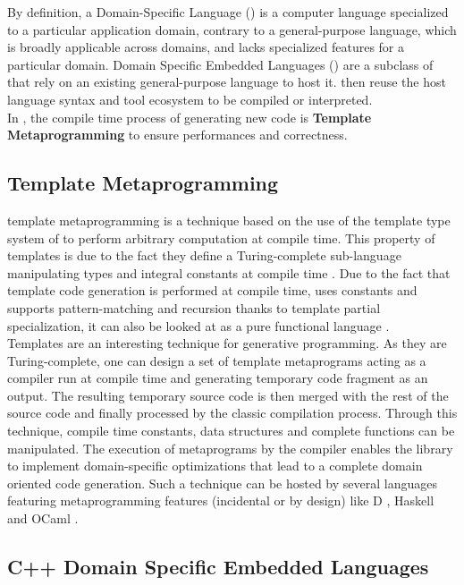 \documentclass[../../main.tex]{subfiles}
\begin{document}
By definition, a Domain-Specific Language (\dsl) is a computer language
specialized to a particular application domain, contrary to a general-purpose
language, which is broadly applicable across domains, and lacks specialized
features for a particular domain. Domain Specific Embedded Languages (\dsels)
are a subclass of \dsl that rely on an existing general-purpose language to host
it. \dsels then reuse the host language syntax and tool ecosystem to be compiled
or interpreted.\\

In \cpp, the compile time process of generating new code is \textbf{Template
Metaprogramming} to ensure performances and correctness.

\subsection{Template Metaprogramming}

\cpp template metaprogramming \cite{abrahams:2004} is a technique based on the
use of the template type system of \cpp to perform arbitrary computation at
compile time. This property of \cpp templates is due to the fact they
define a Turing-complete sub-language manipulating types and integral constants
at compile time \cite{unruh:1994}. Due to the fact that template code generation
is performed at compile time, uses constants and supports pattern-matching and
recursion thanks to template partial specialization, it can also be looked
at as a pure functional language \cite{haeri:2012}.\\

Templates are an interesting technique for generative programming. As they
are Turing-complete, one can design a set of template metaprograms acting as a
\dsl compiler run at compile time and generating temporary \cpp code fragment as
an output. The resulting temporary source code is then merged with the rest of
the source code and finally processed by the classic compilation process.
Through this technique, compile time constants, data structures and complete
functions can be manipulated. The execution of metaprograms by the compiler
enables the library to implement domain-specific optimizations that lead to a
complete domain oriented code generation. Such a technique can be hosted by
several languages featuring metaprogramming features (incidental or by design)
like D \cite{template:dlang}, Haskell \cite{sheard:2002} and
OCaml \cite{serot:2008}.

\subsection{C++ Domain Specific Embedded Languages}
\end{document}
